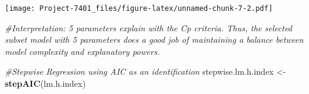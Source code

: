 \documentclass[
]{article}
\newenvironment{Shaded}{\begin{snugshade}}{\end{snugshade}}
\newcommand{\AttributeTok}[1]{\textcolor[rgb]{0.13,0.29,0.53}{#1}}
\newcommand{\CommentTok}[1]{\textcolor[rgb]{0.56,0.35,0.01}{\textit{#1}}}
\newcommand{\DecValTok}[1]{\textcolor[rgb]{0.00,0.00,0.81}{#1}}
\newcommand{\FloatTok}[1]{\textcolor[rgb]{0.00,0.00,0.81}{#1}}
\newcommand{\FunctionTok}[1]{\textcolor[rgb]{0.13,0.29,0.53}{\textbf{#1}}}
\newcommand{\NormalTok}[1]{#1}
\newcommand{\OtherTok}[1]{\textcolor[rgb]{0.56,0.35,0.01}{#1}}
\newcommand{\SpecialCharTok}[1]{\textcolor[rgb]{0.81,0.36,0.00}{\textbf{#1}}}
\newcommand{\StringTok}[1]{\textcolor[rgb]{0.31,0.60,0.02}{#1}}
\begin{document}
\begin{Shaded}
\end{Shaded}

\texttt{[image: Project-7401\_files/figure-latex/unnamed-chunk-7-2.pdf]}

\begin{Shaded}
\begin{Highlighting}[]
\CommentTok{\#Interpretation: 5 parameters explain with the Cp criteria. Thus, the selected subset model with 5 parameters does a good job of maintaining a balance between model complexity and explanatory powers.}
\end{Highlighting}
\end{Shaded}

\begin{Shaded}
\begin{Highlighting}[]
\CommentTok{\#Stepwise Regression using AIC as an identification}
\NormalTok{stepwise.lm.h.index }\OtherTok{\textless{}{-}} \FunctionTok{stepAIC}\NormalTok{(lm.h.index)}
\end{Highlighting}
\end{Shaded}
\end{document}

